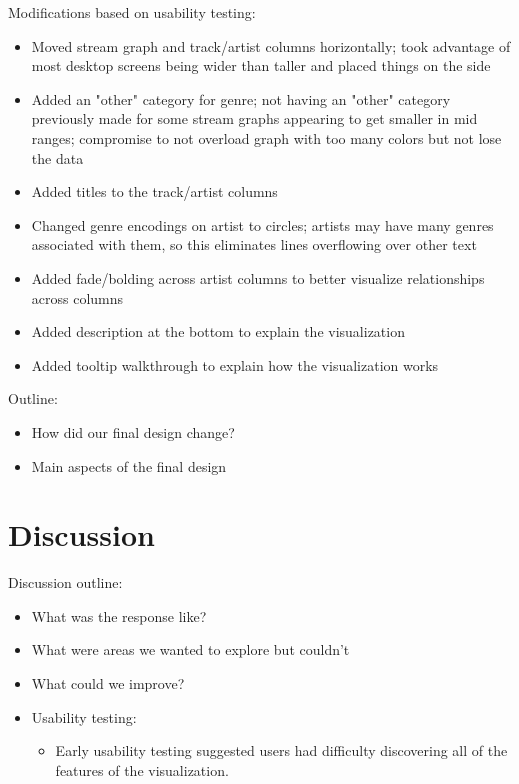 \documentclass[journal]{vgtc}                %
\begin{document}
Modifications based on usability testing:
\begin{itemize}
  \item Moved stream graph and track/artist columns horizontally; took advantage of most desktop screens being wider than taller and placed things on the side
  \item Added an "other" category for genre; not having an "other" category previously made for some stream graphs appearing to get smaller in mid ranges; compromise to not overload graph with too many colors but not lose the data
  \item Added titles to the track/artist columns
  \item Changed genre encodings on artist to circles; artists may have many genres associated with them, so this eliminates lines overflowing over other text
  \item Added fade/bolding across artist columns to better visualize relationships across columns
  \item Added description at the bottom to explain the visualization
  \item Added tooltip walkthrough to explain how the visualization works
\end{itemize}

Outline:
\begin{itemize}
  \item How did our final design change?
  \item Main aspects of the final design
\end{itemize}

\section{Discussion}

Discussion outline:
\begin{itemize}
  \item What was the response like?
  \item What were areas we wanted to explore but couldn't
  \item What could we improve?
  \item Usability testing:
  \begin{itemize}
    \item Early usability testing suggested users had difficulty discovering all of the features of the visualization.
  \end{itemize}
\end{itemize}
\end{document}
